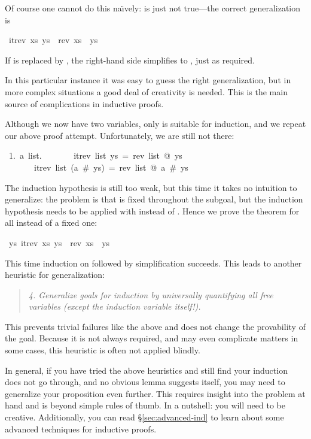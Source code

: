 \begin{isabelle}
\begin{isamarkuptxt}
Of course one cannot do this na\"{\i}vely:  is
just not true---the correct generalization is%
\end{isamarkuptxt}%
\ {\isachardoublequote}itrev\ xs\ ys\ {\isacharequal}\ rev\ xs\ {\isacharat}\ ys{\isachardoublequote}%
\begin{isamarkuptxt}%
\noindent
If  is replaced by \isa{[]}, the right-hand side simplifies to
, just as required.

In this particular instance it was easy to guess the right generalization,
but in more complex situations a good deal of creativity is needed. This is
the main source of complications in inductive proofs.

Although we now have two variables, only  is suitable for
induction, and we repeat our above proof attempt. Unfortunately, we are still
not there:
\begin{isabellepar}%
~1.~{\isasymAnd}a~list.\isanewline
~~~~~~~itrev~list~ys~=~rev~list~@~ys~{\isasymLongrightarrow}\isanewline
~~~~~~~itrev~list~(a~\#~ys)~=~rev~list~@~a~\#~ys%
\end{isabellepar}%
The induction hypothesis is still too weak, but this time it takes no
intuition to generalize: the problem is that  is fixed throughout
the subgoal, but the induction hypothesis needs to be applied with
 instead of . Hence we prove the theorem
for all  instead of a fixed one:%
\end{isamarkuptxt}%
\ {\isachardoublequote}{\isasymforall}ys{\isachardot}\ itrev\ xs\ ys\ {\isacharequal}\ rev\ xs\ {\isacharat}\ ys{\isachardoublequote}%
\begin{isamarkuptxt}%
\noindent
This time induction on  followed by simplification succeeds. This
leads to another heuristic for generalization:
\begin{quote}
{\em 4. Generalize goals for induction by universally quantifying all free
variables {\em(except the induction variable itself!)}.}
\end{quote}
This prevents trivial failures like the above and does not change the
provability of the goal. Because it is not always required, and may even
complicate matters in some cases, this heuristic is often not
applied blindly.

In general, if you have tried the above heuristics and still find your
induction does not go through, and no obvious lemma suggests itself, you may
need to generalize your proposition even further. This requires insight into
the problem at hand and is beyond simple rules of thumb. In a nutshell: you
will need to be creative. Additionally, you can read \S\ref{sec:advanced-ind}
to learn about some advanced techniques for inductive proofs.%
\end{isamarkuptxt}%
\end{isabelle}%
